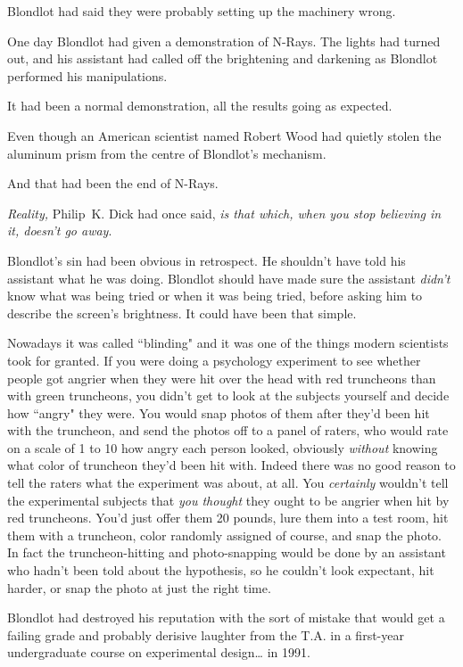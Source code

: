Blondlot had said they were probably setting up the machinery wrong.

One day Blondlot had given a demonstration of N-Rays. The lights had turned out, and his assistant had called off the brightening and darkening as Blondlot performed his manipulations.

It had been a normal demonstration, all the results going as expected.

Even though an American scientist named Robert Wood had quietly stolen the aluminum prism from the centre of Blondlot's mechanism.

And that had been the end of N-Rays.

\emph{Reality,} Philip~K. Dick had once said, \emph{is that which, when you stop believing in it, doesn't go away}.

Blondlot's sin had been obvious in retrospect. He shouldn't have told his assistant what he was doing. Blondlot should have made sure the assistant \emph{didn't} know what was being tried or when it was being tried, before asking him to describe the screen's brightness. It could have been that simple.

Nowadays it was called ``blinding" and it was one of the things modern scientists took for granted. If you were doing a psychology experiment to see whether people got angrier when they were hit over the head with red truncheons than with green truncheons, you didn't get to look at the subjects yourself and decide how ``angry" they were. You would snap photos of them after they'd been hit with the truncheon, and send the photos off to a panel of raters, who would rate on a scale of 1 to 10 how angry each person looked, obviously \emph{without} knowing what color of truncheon they'd been hit with. Indeed there was no good reason to tell the raters what the experiment was about, at all. You \emph{certainly} wouldn't tell the experimental subjects that \emph{you thought} they ought to be angrier when hit by red truncheons. You'd just offer them 20 pounds, lure them into a test room, hit them with a truncheon, color randomly assigned of course, and snap the photo. In fact the truncheon-hitting and photo-snapping would be done by an assistant who hadn't been told about the hypothesis, so he couldn't look expectant, hit harder, or snap the photo at just the right time.

Blondlot had destroyed his reputation with the sort of mistake that would get a failing grade and probably derisive laughter from the T.A. in a first-year undergraduate course on experimental design{\ldots} in 1991.

